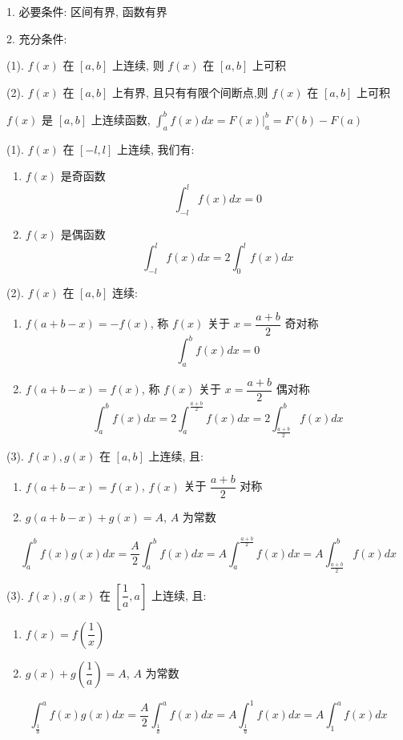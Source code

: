 \begin{theorem}[定积分存在定理]
	1. 必要条件: 区间有界, 函数有界

	2. 充分条件:

	(1). $f(x)$ 在 $[a,b]$ 上连续, 则 $f(x)$ 在 $[a,b]$ 上可积

	(2). $f(x)$ 在 $[a,b]$ 上有界, 且只有有限个间断点,则 $f(x)$ 在 $[a,b]$ 上可积
\end{theorem}
\begin{theorem}[牛顿莱布尼茨公式]
	$f(x)$ 是 $[a,b]$ 上连续函数, $\displaystyle{\int_{a}^{b}f(x)dx = F(x)|_{a}^{b} = F(b) - F(a)}$
\end{theorem}
\begin{theorem}[对称函数积分]
	(1). $f(x)$ 在 $[-l,l]$ 上连续, 我们有:
	\begin{enumerate}
		\item $f(x)$ 是奇函数
		$$\int_{-l}^{l} f(x)dx = 0$$
		\item $f(x)$ 是偶函数
		$$\int_{-l}^{l} f(x)dx = 2\int_{0}^{l} f(x)dx$$
	\end{enumerate}

	(2). $f(x)$ 在 $[a,b]$ 连续:
	\begin{enumerate}
		\item $f(a+b-x) = -f(x)$, 称 $f(x)$ 关于 $x = \dfrac{a+b}{2}$ 奇对称
		$$\int_{a}^{b}f(x)dx = 0$$
		\item $f(a+b-x) = f(x)$, 称 $f(x)$ 关于 $x = \dfrac{a+b}{2}$ 偶对称
		$$\int_{a}^{b}f(x)dx = 2\int_{a}^{\frac{a+b}{2}}f(x)dx = 2\int_{\frac{a+b}{2}}^{b}f(x)dx$$
	\end{enumerate}

	(3). $f(x),g(x)$ 在 $[a,b]$ 上连续, 且:

	\begin{enumerate}
		\item $f(a+b-x) = f(x)$, $f(x)$ 关于 $\dfrac{a+b}{2}$ 对称
		\item $g(a+b-x) + g(x) =A$, $A$ 为常数
	\end{enumerate}

	$$\int_{a}^{b}f(x)g(x) dx= \dfrac{A}{2}\int_{a}^{b}f(x)dx = A\int_{a}^{\frac{a+b}{2}}f(x)dx = A\int_{\frac{a+b}{2}}^{b}f(x)dx$$

	(3). $f(x),g(x)$ 在 $[\dfrac{1}{a},a]$ 上连续, 且:

	\begin{enumerate}
		\item $f(x) = f(\dfrac{1}{x})$
		\item $g(x) + g(\dfrac{1}{a}) =A$, $A$ 为常数
	\end{enumerate}

	$$\int_{\frac{1}{a}}^{a}f(x)g(x) dx= \dfrac{A}{2}\int_{\frac{1}{a}}^{a}f(x)dx = A\int_{\frac{1}{a}}^{1}f(x)dx = A\int_{1}^{a}f(x)dx$$
\end{theorem}
